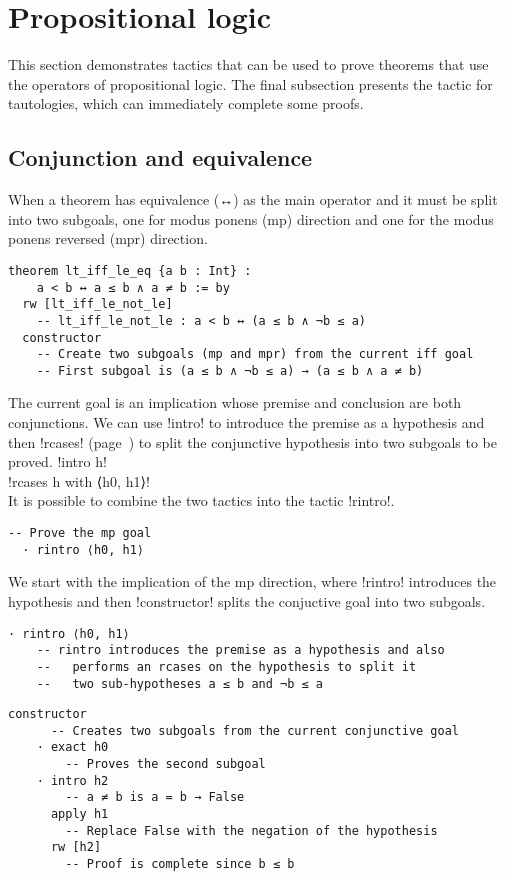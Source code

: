 
\section{Propositional logic}

This section demonstrates tactics that can be used to prove theorems that use the operators of propositional logic. The final subsection presents the tactic for tautologies, which can immediately complete some proofs.

\subsection{Conjunction and equivalence}

When a theorem has equivalence (↔) as the main operator and it must be split into two subgoals, one for modus ponens (mp) direction and one for the modus ponens reversed (mpr) direction.

\begin{Verbatim}
theorem lt_iff_le_eq {a b : Int} : 
    a < b ↔ a ≤ b ∧ a ≠ b := by
  rw [lt_iff_le_not_le]
    -- lt_iff_le_not_le : a < b ↔ (a ≤ b ∧ ¬b ≤ a)
  constructor
    -- Create two subgoals (mp and mpr) from the current iff goal
    -- First subgoal is (a ≤ b ∧ ¬b ≤ a) → (a ≤ b ∧ a ≠ b)
 \end{Verbatim}


The current goal is an implication whose premise and conclusion are both conjunctions. We can use !intro! to introduce the premise as a hypothesis and then !rcases! (page~\pageref{p.rcases}) to split the conjunctive hypothesis into two subgoals to be proved.
\indnt{}!intro h!\\
\indnt{}!rcases h with ⟨h0, h1⟩!\\
It is possible to combine the two tactics into the tactic !rintro!.
\begin{Verbatim}[firstnumber=last]
  -- Prove the mp goal
  · rintro ⟨h0, h1⟩
\end{Verbatim}

We start with the implication of the mp direction, where !rintro! introduces the hypothesis and then !constructor! splits the conjuctive goal into two subgoals.
\begin{Verbatim}[firstnumber=last]
  · rintro ⟨h0, h1⟩
    -- rintro introduces the premise as a hypothesis and also
    --   performs an rcases on the hypothesis to split it
    --   two sub-hypotheses a ≤ b and ¬b ≤ a
\end{Verbatim}
\begin{Verbatim}[firstnumber=last]
    constructor
      -- Creates two subgoals from the current conjunctive goal
    · exact h0
        -- Proves the second subgoal
    · intro h2
        -- a ≠ b is a = b → False
      apply h1
        -- Replace False with the negation of the hypothesis
      rw [h2]
        -- Proof is complete since b ≤ b
\end{Verbatim}

